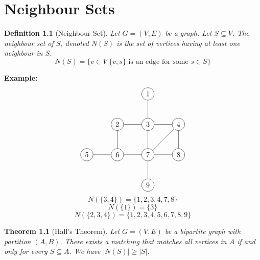 \documentclass[openany]{report}
\newtheorem{theorem}{Theorem}[section]
\newtheorem{definition}{Definition}[section]
\begin{document}
\chapter{Neighbour Sets}
\begin{definition}[Neighbour Set]
    Let $G = (V,E)$ be a graph. Let $S \subseteq V$. The \emph{neighbour set} of $S$, denoted $N(S)$ is the set of vertices having at least one neighbour in $S$. 
    \[N(S) = \{v \in V | \{v, s\} \text{ is an edge for some $s \in S$}\}\]
\end{definition}
\noindent
\textbf{Example:}
\[
\begin{tikzpicture}[node distance={15mm}, main/.style ={draw, circle}]
    \node[main] (1) {1};
    \node[main] (2) [below of=1]{3};
    \node[main] (3) [left of=2]{2};
    \node[main] (4) [right of=2]{4};
    \node[main] (5) [below of=2]{7};
    \node[main] (6) [left of=5]{6};
    \node[main] (7) [right of=5]{8};
    \node[main] (8) [below of=5]{9};
    \node[main] (9) [left of=6] {5};
    \draw (1)--(2);
    \draw (2)--(3);
    \draw (2)--(4);
    \draw (2)--(5);
    \draw (5)--(6);
    \draw (5)--(7);
    \draw (5)--(8);
    \draw (6)--(9);
    \draw (4)--(5);
    \draw (4)--(7);
    \draw (3)--(6);
\end{tikzpicture}
\] 
\[N(\{3,4\}) = \{1,2,3,4,7,8\}\]
\[N(\{1\}) = \{3\}\]
\[N(\{2,3,4\}) = \{1,2,3,4,5,6,7,8,9\}\]
\begin{theorem}[Hall's Theorem]
    Let $G = (V,E)$ be a bipartite graph with partition $(A,B)$. There exists a matching that matches all vertices in $A$ if and only for every $S \subseteq A$. We have $|N(S)| \geq |S|$.
\end{theorem}
\end{document}
